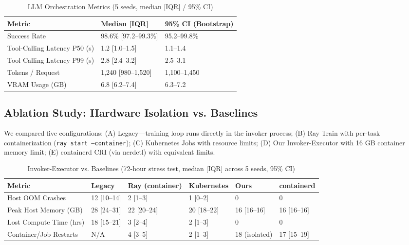 \documentclass[10pt,twocolumn,letterpaper]{article}
\begin{document}
\begin{table}[htbp]
\centering
\caption{LLM Orchestration Metrics (5 seeds, median [IQR] / 95\% CI)}
\label{tab:llm_metrics}
\begin{tabular}{@{}lll@{}}
\toprule
Metric & Median [IQR] & 95\% CI (Bootstrap) \\ \midrule
Success Rate & 98.6\% [97.2--99.3\%] & 95.2--99.8\% \\
Tool-Calling Latency P50 (s) & 1.2 [1.0--1.5] & 1.1--1.4 \\
Tool-Calling Latency P99 (s) & 2.8 [2.4--3.2] & 2.5--3.1 \\
Tokens / Request & 1,240 [980--1,520] & 1,100--1,450 \\
VRAM Usage (GB) & 6.8 [6.2--7.4] & 6.3--7.2 \\ \bottomrule
\end{tabular}
\end{table}

\subsection{Ablation Study: Hardware Isolation vs. Baselines}
We compared five configurations: (A) Legacy---training loop runs directly in the invoker process; (B) Ray Train with per-task containerization (\texttt{ray start --container}); (C) Kubernetes Jobs with resource limits; (D) Our Invoker-Executor with 16 GB container memory limit; (E) containerd CRI (via nerdctl) with equivalent limits.

\begin{table}[htbp]
\centering
\caption{Invoker-Executor vs. Baselines (72-hour stress test, median [IQR] across 5 seeds, 95\% CI)}
\label{tab:ablation_isolation}
\begin{tabular}{@{}llllll@{}}
\toprule
Metric & Legacy & Ray (container) & Kubernetes & Ours & containerd \\ \midrule
Host OOM Crashes & 12 [10--14] & 2 [1--3] & 1 [0--2] & 0 & 0 \\
Peak Host Memory (GB) & 28 [24--31] & 22 [20--24] & 20 [18--22] & 16 [16--16] & 16 [16--16] \\
Lost Compute Time (hrs) & 18 [15--21] & 3 [2--4] & 2 [1--3] & 0 & 0 \\
Container/Job Restarts & N/A & 4 [3--5] & 2 [1--3] & 18 (isolated) & 17 [15--19] \\ \bottomrule
\end{tabular}
\end{table}
\end{document}
